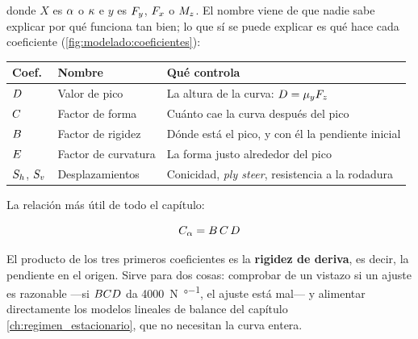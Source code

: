 donde $X$ es $\alpha$ o $\kappa$ e $y$ es $F_y$, $F_x$ o $M_z$. El nombre viene
de que nadie sabe explicar por qué funciona tan bien; lo que sí se puede explicar
es qué hace cada coeficiente (\cref{fig:modelado:coeficientes}):

\begin{center}
\begin{tabularx}{\textwidth}{@{}llX@{}}
\toprule
\textbf{Coef.} & \textbf{Nombre} & \textbf{Qué controla} \\
\midrule
$D$ & Valor de pico & La altura de la curva: $D = \mu_y F_z$ \\
$C$ & Factor de forma & Cuánto cae la curva después del pico \\
$B$ & Factor de rigidez & Dónde está el pico, y con él la pendiente inicial \\
$E$ & Factor de curvatura & La forma justo alrededor del pico \\
$S_h$, $S_v$ & Desplazamientos & Conicidad, \emph{ply steer}, resistencia a la rodadura \\
\bottomrule
\end{tabularx}
\end{center}

\begin{clave}
La relación más útil de todo el capítulo:

\begin{equation}
  C_{\alpha} = B\,C\,D
  \label{eq:bcd}
\end{equation}

El producto de los tres primeros coeficientes es la \textbf{rigidez de deriva},
es decir, la pendiente en el origen. Sirve para dos cosas: comprobar de un
vistazo si un ajuste es razonable ---si $BCD$ da
\SI{4000}{\newton\per\degree}, el ajuste está mal--- y alimentar directamente los
modelos lineales de balance del capítulo \ref{ch:regimen_estacionario}, que no
necesitan la curva entera.
\end{clave}


